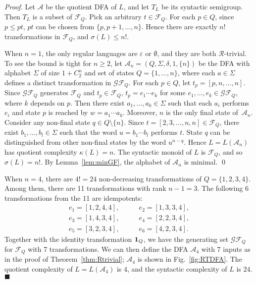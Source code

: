 \documentclass{llncs}
\renewcommand{\le}{\leqslant}
\renewcommand{\ge}{\geqslant}
\newcommand{\eps}{\varepsilon}
\newcommand{\Sig}{\Sigma}
\newcommand{\tid}{\mbox{{\bf 1}}}
\newcommand{\cA}{{\mathcal A}}
\newcommand{\cF}{{\mathcal F}}
\newcommand{\cG}{{\mathcal G}}
\newcommand{\gR}{{\mathcal R}}
\newcommand{\qedb}{\hfill$\blacksquare$}
\begin{document}
\begin{proof}
Let $\cA$ be the quotient DFA of $L$, and let $T_L$ be its syntactic semigroup. Then $T_L$ is a subset of $\cF_Q$. Pick an arbitrary $t \in \cF_Q$. For each $p \in Q$, since $p \le pt$, $pt$ can be chosen from $\{p, p+1, \ldots, n\}$. Hence there are exactly $n!$ transformations in $\cF_Q$, and $\sigma(L) \le n!$. 

When $n = 1$, the only regular languages are $\eps$ or $\emptyset$, and they are both  $\gR$-trivial. To see the bound is tight for $n \ge 2$, let $\cA_n = (Q, \Sig, \delta, 1, \{n\})$ be the DFA with alphabet $\Sig$ of size $1+C^n_2$ and set of states $Q = \{1,\ldots,n\}$, where each $a \in \Sig$ defines a distinct transformation in $\cG\cF_Q$. For each $p \in Q$, let $t_p = [p,n,\ldots,n]$. Since $\cG\cF_Q$ generates $\cF_Q$ and $t_p \in \cF_Q$, $t_p = e_1 \cdots e_k$ for some $e_1,\ldots,e_k \in \cG\cF_Q$, where $k$ depends on $p$. Then there exist $a_1,\ldots,a_k \in \Sig$ such that each $a_i$ performs $e_i$ and state $p$ is reached by $w = a_1 \cdots a_k$. Moreover, $n$ is the only final state of~$\cA_n$. Consider any non-final state $q \in Q \setminus \{n\}$. Since $t = [2,3,\ldots,n,n] \in \cF_Q$, there exist $b_1, \ldots, b_l \in \Sig$ such that the word $u = b_1 \cdots b_l$ performs $t$. State $q$ can be distinguished from other non-final states by the word $u^{n-q}$. Hence $L = L(\cA_n)$ has quotient complexity $\kappa(L) = n$. The syntactic monoid of $L$ is $\cF_Q$, and so $\sigma(L) = n!$. By Lemma~\ref{lem:minGF}, the alphabet of $\cA_n$ is minimal. \qed
\end{proof}


\begin{example}\label{ex:Rtrivial}
When $n = 4$, there are $4! = 24$ non-decreasing transformations of $Q = \{1,2,3,4\}$. Among them, there are 11 transformations with rank $n-1 = 3$. The following 6 transformations from the 11 are idempotents: 
\begin{align*}
  e_1 = [1, 2, 4, 4], & \qquad e_2 = [1, 3, 3, 4], \\
  e_3 = [1, 4, 3, 4], & \qquad e_4 = [2, 2, 3, 4], \\
  e_5 = [3, 2, 3, 4], & \qquad e_6 = [4, 2, 3, 4].
\end{align*}
Together with the identity transformation $\tid_Q$, we have the generating set $\cG\cF_Q$ for $\cF_Q$ with 7 transformations. We can then define the DFA $\cA_4$ with 7 inputs as in the proof of Theorem~\ref{thm:Rtrivial}; $\cA_4$ is shown in Fig.~\ref{fig:RTDFA}. The quotient complexity of $L = L(\cA_4)$ is $4$, and the syntactic complexity of $L$ is $24$. \qedb
\end{example}
\end{document}
